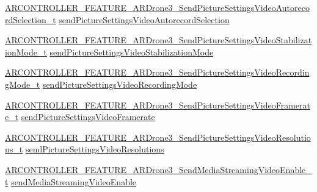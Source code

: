 \begin{DoxyCompactItemize}
\item 
\hyperlink{_a_r_c_o_n_t_r_o_l_l_e_r___feature_8h_a8aaa9a27668fc588dce114ac540c5769}{A\+R\+C\+O\+N\+T\+R\+O\+L\+L\+E\+R\+\_\+\+F\+E\+A\+T\+U\+R\+E\+\_\+\+A\+R\+Drone3\+\_\+\+Send\+Picture\+Settings\+Video\+Autorecord\+Selection\+\_\+t} \hyperlink{struct_a_r_c_o_n_t_r_o_l_l_e_r___f_e_a_t_u_r_e___a_r_drone3__t_a2c366f42c36debb5824cc849ce3388c0}{send\+Picture\+Settings\+Video\+Autorecord\+Selection}
\item 
\hyperlink{_a_r_c_o_n_t_r_o_l_l_e_r___feature_8h_a184903567ebc5827305696cd9c33c93f}{A\+R\+C\+O\+N\+T\+R\+O\+L\+L\+E\+R\+\_\+\+F\+E\+A\+T\+U\+R\+E\+\_\+\+A\+R\+Drone3\+\_\+\+Send\+Picture\+Settings\+Video\+Stabilization\+Mode\+\_\+t} \hyperlink{struct_a_r_c_o_n_t_r_o_l_l_e_r___f_e_a_t_u_r_e___a_r_drone3__t_a3e0c011306ed45967fe3d0a03d56eb5a}{send\+Picture\+Settings\+Video\+Stabilization\+Mode}
\item 
\hyperlink{_a_r_c_o_n_t_r_o_l_l_e_r___feature_8h_a6c565b031af90b50e27d2070a58c2892}{A\+R\+C\+O\+N\+T\+R\+O\+L\+L\+E\+R\+\_\+\+F\+E\+A\+T\+U\+R\+E\+\_\+\+A\+R\+Drone3\+\_\+\+Send\+Picture\+Settings\+Video\+Recording\+Mode\+\_\+t} \hyperlink{struct_a_r_c_o_n_t_r_o_l_l_e_r___f_e_a_t_u_r_e___a_r_drone3__t_a596925a1d1ec95063d6e85c8cad20aba}{send\+Picture\+Settings\+Video\+Recording\+Mode}
\item 
\hyperlink{_a_r_c_o_n_t_r_o_l_l_e_r___feature_8h_aeed68bf0d119d22cd7ed01349ad33d17}{A\+R\+C\+O\+N\+T\+R\+O\+L\+L\+E\+R\+\_\+\+F\+E\+A\+T\+U\+R\+E\+\_\+\+A\+R\+Drone3\+\_\+\+Send\+Picture\+Settings\+Video\+Framerate\+\_\+t} \hyperlink{struct_a_r_c_o_n_t_r_o_l_l_e_r___f_e_a_t_u_r_e___a_r_drone3__t_ac51f5621740187bf0a847b8e74174153}{send\+Picture\+Settings\+Video\+Framerate}
\item 
\hyperlink{_a_r_c_o_n_t_r_o_l_l_e_r___feature_8h_a8d7ebaac92260d5c03edbe587b1a6f74}{A\+R\+C\+O\+N\+T\+R\+O\+L\+L\+E\+R\+\_\+\+F\+E\+A\+T\+U\+R\+E\+\_\+\+A\+R\+Drone3\+\_\+\+Send\+Picture\+Settings\+Video\+Resolutions\+\_\+t} \hyperlink{struct_a_r_c_o_n_t_r_o_l_l_e_r___f_e_a_t_u_r_e___a_r_drone3__t_a2442498223a5c29d2349b88493d792ff}{send\+Picture\+Settings\+Video\+Resolutions}
\item 
\hyperlink{_a_r_c_o_n_t_r_o_l_l_e_r___feature_8h_aee27ef475a1b81f3a726a04dff34baeb}{A\+R\+C\+O\+N\+T\+R\+O\+L\+L\+E\+R\+\_\+\+F\+E\+A\+T\+U\+R\+E\+\_\+\+A\+R\+Drone3\+\_\+\+Send\+Media\+Streaming\+Video\+Enable\+\_\+t} \hyperlink{struct_a_r_c_o_n_t_r_o_l_l_e_r___f_e_a_t_u_r_e___a_r_drone3__t_a6d9db57f0cdcc8164e4c7afb652b08a8}{send\+Media\+Streaming\+Video\+Enable}
\item 

\end{DoxyCompactItemize}
